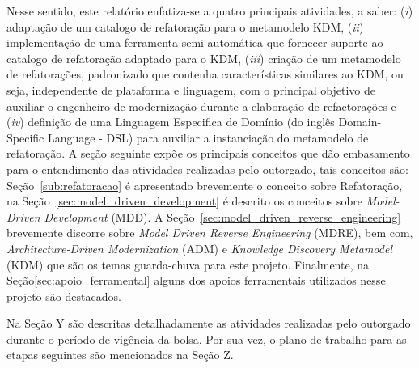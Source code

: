 Nesse sentido, este relatório enfatiza-se a quatro principais atividades, a saber: (\textit{i}) adaptação de um catalogo de refatoração para o metamodelo KDM, (\textit{ii}) implementação de uma ferramenta semi-automática que fornecer suporte ao catalogo de refatoração adaptado para o KDM, (\textit{iii}) criação de um metamodelo de refatorações, padronizado que contenha características similares ao KDM, ou seja, independente de plataforma e linguagem, com o principal objetivo de auxiliar o engenheiro de modernização durante a elaboração de refactorações e (\textit{iv}) definição de uma Linguagem Especifica de Domínio (do inglês Domain-Specific Language - DSL) para auxiliar a instanciação do metamodelo de refatoração. A seção seguinte expõe os principais conceitos que dão embasamento para o entendimento das atividades realizadas pelo outorgado, tais conceitos são: Seção~\ref{sub:refatoracao} é apresentado brevemente o conceito sobre Refatoração, na Seção~\ref{sec:model_driven_development} é descrito os conceitos sobre \textit{Model-Driven Development} (MDD). A Seção~\ref{sec:model_driven_reverse_engineering} brevemente discorre sobre \textit{Model Driven Reverse Engineering} (MDRE), bem com, \textit{Architecture-Driven Modernization} (ADM) e \textit{Knowledge Discovery Metamodel} (KDM) que são os temas guarda-chuva para este projeto. Finalmente, na Seção\ref{sec:apoio_ferramental} alguns dos apoios ferramentais utilizados nesse projeto são destacados.


Na Seção Y são descritas detalhadamente as atividades realizadas pelo outorgado durante o período de vigência da bolsa. Por sua vez, o plano de trabalho para as etapas seguintes são mencionados na Seção Z.
